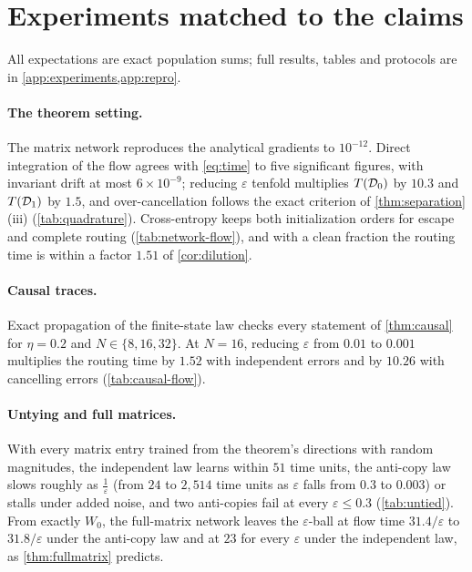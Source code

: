 \section{Experiments matched to the claims}
\label{sec:numerics}

All expectations are exact population sums; full results, tables and protocols are in \cref{app:experiments,app:repro}.

\paragraph{The theorem setting.} The matrix network reproduces the analytical gradients to $10^{-12}$. Direct integration of the flow agrees with \cref{eq:time} to five significant figures, with invariant drift at most $6\times10^{-9}$;
reducing $\varepsilon$ tenfold multiplies $T(\mathcal D_{0})$ by $10.3$ and $T(\mathcal D_{1})$ by $1.5$, and over-cancellation follows the exact criterion of
\cref{thm:separation}(iii) (\cref{tab:quadrature}). Cross-entropy keeps both initialization orders for escape and complete routing
(\cref{tab:network-flow}), and with a clean fraction the routing time is within a factor $1.51$ of \cref{cor:dilution}.

\paragraph{Causal traces.} Exact propagation of the finite-state law checks every statement of \cref{thm:causal} for $\eta=0.2$ and $N\in\{8,16,32\}$.
At $N=16$, reducing $\varepsilon$ from $0.01$ to $0.001$ multiplies the routing time by $1.52$ with independent errors and by $10.26$ with cancelling errors (\cref{tab:causal-flow}).

\paragraph{Untying and full matrices.} With every matrix entry trained from the theorem's directions with random magnitudes, the independent law learns
within $51$ time units, the anti-copy law slows roughly as $\tfrac{1}{\varepsilon}$ (from $24$ to $2{,}514$ time units as $\varepsilon$ falls from $0.3$ to $0.003$) or stalls under
added noise, and two anti-copies fail at every $\varepsilon\le0.3$ (\cref{tab:untied}). From exactly $W_0$, the full-matrix network leaves the $\varepsilon$-ball at flow time
$31.4/\varepsilon$ to $31.8/\varepsilon$ under the anti-copy law and at $23$ for every $\varepsilon$ under the independent law, as \cref{thm:fullmatrix} predicts.

